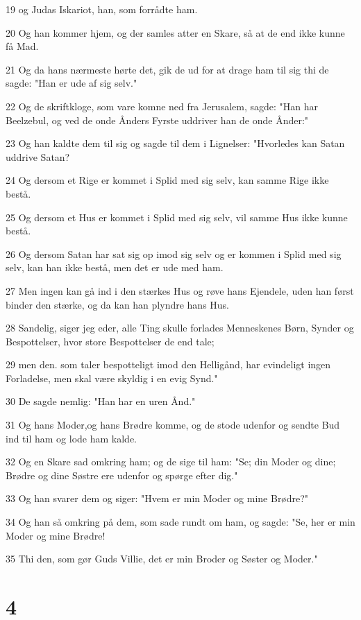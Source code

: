 \par 19 og Judas Iskariot, han, som forrådte ham.
\par 20 Og han kommer hjem, og der samles atter en Skare, så at de end ikke kunne få Mad.
\par 21 Og da hans nærmeste hørte det, gik de ud for at drage ham til sig thi de sagde: "Han er ude af sig selv."
\par 22 Og de skriftkloge, som vare komne ned fra Jerusalem, sagde: "Han har Beelzebul, og ved de onde Ånders Fyrste uddriver han de onde Ånder:"
\par 23 Og han kaldte dem til sig og sagde til dem i Lignelser: "Hvorledes kan Satan uddrive Satan?
\par 24 Og dersom et Rige er kommet i Splid med sig selv, kan samme Rige ikke bestå.
\par 25 Og dersom et Hus er kommet i Splid med sig selv, vil samme Hus ikke kunne bestå.
\par 26 Og dersom Satan har sat sig op imod sig selv og er kommen i Splid med sig selv, kan han ikke bestå, men det er ude med ham.
\par 27 Men ingen kan gå ind i den stærkes Hus og røve hans Ejendele, uden han først binder den stærke, og da kan han plyndre hans Hus.
\par 28 Sandelig, siger jeg eder, alle Ting skulle forlades Menneskenes Børn, Synder og Bespottelser, hvor store Bespottelser de end tale;
\par 29 men den. som taler bespotteligt imod den Helligånd, har evindeligt ingen Forladelse, men skal være skyldig i en evig Synd."
\par 30 De sagde nemlig: "Han har en uren Ånd."
\par 31 Og hans Moder,og hans Brødre komme, og de stode udenfor og sendte Bud ind til ham og lode ham kalde.
\par 32 Og en Skare sad omkring ham; og de sige til ham: "Se; din Moder og dine; Brødre og dine Søstre ere udenfor og spørge efter dig."
\par 33 Og han svarer dem og siger: "Hvem er min Moder og mine Brødre?"
\par 34 Og han så omkring på dem, som sade rundt om ham, og sagde: "Se, her er min Moder og mine Brødre!
\par 35 Thi den, som gør Guds Villie, det er min Broder og Søster og Moder."

\chapter{4}

